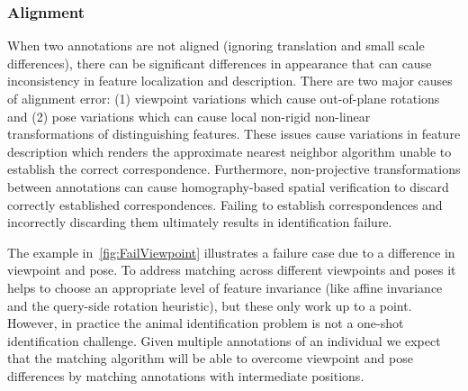         \FloatBarrier{}
        \subsubsection{Alignment}
            
            When two annotations are not aligned (ignoring translation and small scale differences), there can be
            significant differences in appearance that can cause inconsistency in feature localization and
            description. There are two major causes of alignment error: (1) viewpoint variations which cause
            out-of-plane rotations and (2) pose variations which can cause local non-rigid non-linear
            transformations of distinguishing features. These issues cause variations in feature description which
            renders the approximate nearest neighbor algorithm unable to establish the correct correspondence.
            Furthermore, non-projective transformations between annotations can cause homography-based spatial
            verification to discard correctly established correspondences. Failing to establish correspondences and
            incorrectly discarding them ultimately results in identification failure.

            The example in~\cref{fig:FailViewpoint} illustrates a failure case due to a difference in viewpoint and
            pose. To address matching across different viewpoints and poses it helps to choose an appropriate level
            of feature invariance (like affine invariance and the query-side rotation heuristic), but these only
            work up to a point. However, in practice the animal identification problem is not a one-shot
            identification challenge. Given multiple annotations of an individual we expect that the matching
            algorithm will be able to overcome viewpoint and pose differences by matching annotations with
            intermediate positions.

            \FailViewpoint{}

        \FloatBarrier{}
